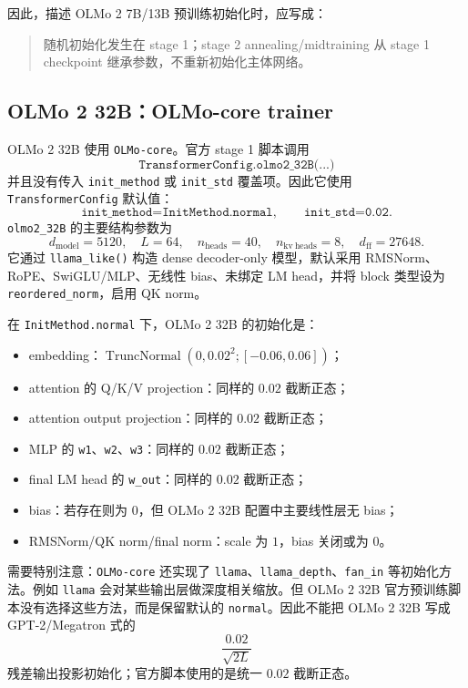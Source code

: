 \documentclass[UTF8,a4paper,11pt]{ctexart}
\newcommand{\TruncNormal}{\operatorname{TruncNormal}}
\begin{document}
因此，描述 OLMo 2 7B/13B 预训练初始化时，应写成：

\begin{quote}
随机初始化发生在 stage 1；stage 2 annealing/midtraining 从 stage 1 checkpoint 继承参数，不重新初始化主体网络。
\end{quote}

\subsection{OLMo 2 32B：OLMo-core trainer}

OLMo 2 32B 使用 \texttt{OLMo-core}。官方 stage 1 脚本调用
\[
  \texttt{TransformerConfig.olmo2\_32B(...)}
\]
并且没有传入 \texttt{init\_method} 或 \texttt{init\_std} 覆盖项。因此它使用 \texttt{TransformerConfig} 默认值：
\[
  \texttt{init\_method=InitMethod.normal},\qquad
  \texttt{init\_std=0.02}.
\]
\texttt{olmo2\_32B} 的主要结构参数为
\[
  d_{\mathrm{model}}=5120,\quad L=64,\quad n_{\mathrm{heads}}=40,\quad n_{\mathrm{kv\ heads}}=8,\quad d_{\mathrm{ff}}=27648.
\]
它通过 \texttt{llama\_like()} 构造 dense decoder-only 模型，默认采用 RMSNorm、RoPE、SwiGLU/MLP、无线性 bias、未绑定 LM head，并将 block 类型设为 \texttt{reordered\_norm}，启用 QK norm。

在 \texttt{InitMethod.normal} 下，OLMo 2 32B 的初始化是：

\begin{itemize}
  \item embedding：$\TruncNormal(0,0.02^2;[-0.06,0.06])$；
  \item attention 的 Q/K/V projection：同样的 $0.02$ 截断正态；
  \item attention output projection：同样的 $0.02$ 截断正态；
  \item MLP 的 \texttt{w1}、\texttt{w2}、\texttt{w3}：同样的 $0.02$ 截断正态；
  \item final LM head 的 \texttt{w\_out}：同样的 $0.02$ 截断正态；
  \item bias：若存在则为 $0$，但 OLMo 2 32B 配置中主要线性层无 bias；
  \item RMSNorm/QK norm/final norm：scale 为 $1$，bias 关闭或为 $0$。
\end{itemize}

需要特别注意：\texttt{OLMo-core} 还实现了 \texttt{llama}、\texttt{llama\_depth}、\texttt{fan\_in} 等初始化方法。例如 \texttt{llama} 会对某些输出层做深度相关缩放。但 OLMo 2 32B 官方预训练脚本没有选择这些方法，而是保留默认的 \texttt{normal}。因此不能把 OLMo 2 32B 写成 GPT-2/Megatron 式的
\[
  \frac{0.02}{\sqrt{2L}}
\]
残差输出投影初始化；官方脚本使用的是统一 $0.02$ 截断正态。
\end{document}
